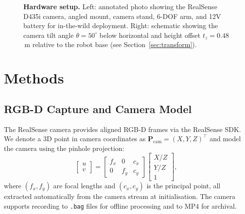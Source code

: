 \documentclass{ieeeaccess}
\newcommand{\vect}[1]{\mathbf{#1}}
\begin{document}
\begin{figure}[t]
\begin{minipage}[b]{0.55\columnwidth}
\end{minipage}
\caption{\textbf{Hardware setup.} Left: annotated photo showing the
  RealSense D435i camera, angled mount, camera stand, 6-DOF arm, and
  12V battery for in-the-wild deployment.
  Right: schematic showing the camera tilt angle
  $\theta = 50^{\circ}$ below horizontal and height offset
  $t_z = 0.48$\,m relative to the robot base
  (see Section~\ref{sec:transform}).}
\label{fig:bench}
\end{figure}

\section{Methods}
\label{sec:methods}

\subsection{RGB-D Capture and Camera Model}
\label{sec:camera}

The RealSense camera provides aligned RGB-D frames via the
RealSense SDK. We denote a 3D point in camera coordinates as
$\vect{P}_{\text{cam}} = (X, Y, Z)^\top$ and model the camera
using the pinhole projection:
\begin{equation}\label{eq:projection}
  \begin{bmatrix} u \\ v \end{bmatrix}
  = \begin{bmatrix} f_x & 0 & c_x \\ 0 & f_y & c_y \end{bmatrix}
    \begin{bmatrix} X/Z \\ Y/Z \\ 1 \end{bmatrix},
\end{equation}
where $(f_x, f_y)$ are focal lengths and $(c_x, c_y)$ is the principal
point, all extracted automatically from the camera stream at
initialisation. The camera supports recording to \texttt{.bag} files for
offline processing and to MP4 for archival.
\end{document}
